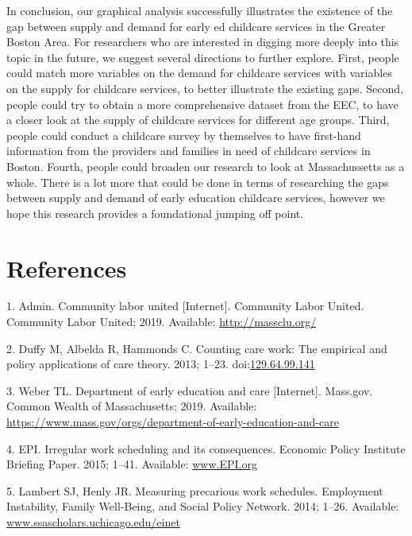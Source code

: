 \documentclass[10pt,letterpaper]{article}
\begin{document}
In conclusion, our graphical analysis successfully illustrates the
existence of the gap between supply and demand for early ed childcare
services in the Greater Boston Area. For researchers who are interested
in digging more deeply into this topic in the future, we suggest several
directions to further explore. First, people could match more variables
on the demand for childcare services with variables on the supply for
childcare services, to better illustrate the existing gaps. Second,
people could try to obtain a more comprehensive dataset from the EEC, to
have a closer look at the supply of childcare services for different age
groups. Third, people could conduct a childcare survey by themselves to
have first-hand information from the providers and families in need of
childcare services in Boston. Fourth, people could broaden our research
to look at Massachussetts as a whole. There is a lot more that could be
done in terms of researching the gaps between supply and demand of early
education childcare services, however we hope this research provides a
foundational jumping off point.

\section*{References}\label{references.unumbered}

\hypertarget{refs}{}
\hypertarget{ref-CLU}{}
1. Admin. Community labor united {[}Internet{]}. Community Labor United.
Community Labor United; 2019. Available: \url{http://massclu.org/}

\hypertarget{ref-duffy_albelda_hammonds_2013}{}
2. Duffy M, Albelda R, Hammonds C. Counting care work: The empirical and
policy applications of care theory. 2013; 1--23.
doi:\href{https://doi.org/129.64.99.141}{129.64.99.141}

\hypertarget{ref-EEC}{}
3. Weber TL. Department of early education and care {[}Internet{]}.
Mass.gov. Common Wealth of Massachusetts; 2019. Available:
\url{https://www.mass.gov/orgs/department-of-early-education-and-care}

\hypertarget{ref-epi_2015}{}
4. EPI. Irregular work scheduling and its consequences. Economic Policy
Institute Briefing Paper. 2015; 1--41. Available: \url{www.EPI.org}

\hypertarget{ref-lambert_henly_2014}{}
5. Lambert SJ, Henly JR. Measuring precarious work schedules. Employment
Instability, Family Well-Being, and Social Policy Network. 2014; 1--26.
Available: \url{www.ssascholars.uchicago.edu/einet}
\end{document}
